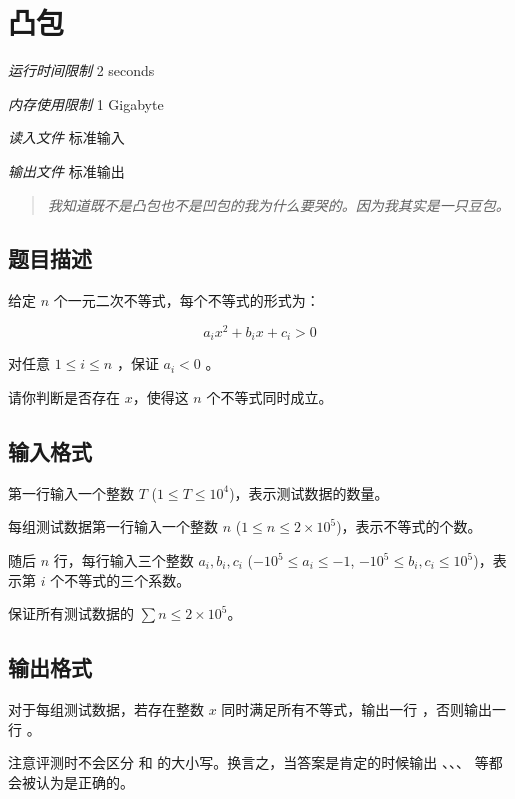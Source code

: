 \section[F. 凸包]{ 凸包}

\textit{运行时间限制}   2 seconds

\textit{内存使用限制} 1 Gigabyte

\textit{读入文件} \qquad 标准输入

\textit{输出文件} \qquad 标准输出


\begin{quote}
	\textit{我知道既不是凸包也不是凹包的我为什么要哭的。因为我其实是一只豆包。}
\end{quote}

\subsection{题目描述}

给定 $n$ 个一元二次不等式，每个不等式的形式为：

$$
a_i x^2 + b_i x + c_i  >  0
$$

对任意 $1 \le i \le n$ ，保证 $a_i < 0$ 。

请你判断是否存在 $x$，使得这 $n$ 个不等式同时成立。

\subsection{输入格式}

第一行输入一个整数 $T$ ($1 \le T \le 10^4$)，表示测试数据的数量。

每组测试数据第一行输入一个整数 $n$ ($1 \le n \le 2 \times 10^5$)，表示不等式的个数。

随后 $n$ 行，每行输入三个整数 $a_i, b_i, c_i$ ($-10^5 \le a_i \le -1$, $-10^5 \le b_i, c_i \le 10^5$)，表示第 $i$ 个不等式的三个系数。

保证所有测试数据的 $\sum n \le 2 \times 10^5$。

\subsection{输出格式}

对于每组测试数据，若存在整数 $x$ 同时满足所有不等式，输出一行 ，否则输出一行 。

注意评测时不会区分  和  的大小写。换言之，当答案是肯定的时候输出 、、、 等都会被认为是正确的。

